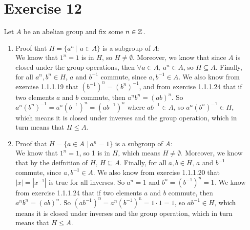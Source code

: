\documentclass[12pt]{article}
\begin{document}
    \section*{Exercise 12}
    Let $A$ be an abelian group and fix some $n \in \mathbb{Z}$. \\
    \begin{enumerate}[label=\textbf{\alph*.}]
        \item 
            Proof that $H = \{a^n \mid a \in A\}$ is a subgroup of $A$: \\
            We know that $1^n = 1$ is in $H$, so $H \neq \emptyset$.
            Moreover, we know that since $A$ is closed under
            the group operations,
            then $\forall a \in A$, $a^n \in A$,
            so $H \subseteq A$.
            Finally, for all $a^n, b^n \in H$, $a$ and $b^{-1}$ commute,
            since $a, b^{-1} \in A$.
            We also know from exercise 1.1.1.19
            that $(b^{-1})^n = (b^n)^{-1}$,
            and from exercise 1.1.1.24 that if two elements $a$ and $b$
            commute, then $a^nb^n = (ab)^n$.
            So $a^n(b^n)^{-1} = a^n(b^{-1})^n = (ab^{-1})^n$
            where $ab^{-1} \in A$,
            so $a^n(b^n)^{-1} \in H$,
            which means it is closed under inverses and the group operation,
            which in turn means that $H \leqslant A$.
        \item
            Proof that $H = \{a \in A \mid a^n = 1\}$ is a subgroup of $A$: \\
            We know that $1^n = 1$, so 1 is in $H$,
            which means $H \neq \emptyset$.
            Moreover, we know that by the deifnition of $H$,
            $H \subseteq A$.
            Finally, for all $a, b \in H$, $a$ and $b^{-1}$ commute,
            since $a, b^{-1} \in A$.
            We also know from exercise 1.1.1.20 that $|x| = |x^{-1}|$
            is true for all inverses.
            So $a^n = 1$ and $b^n = (b^{-1})^n = 1$.
            We know from exercise 1.1.1.24 that if two elements $a$ and $b$
            commute, then $a^nb^n = (ab)^n$.
            So $(ab^{-1})^n = a^n(b^{-1})^n = 1 \cdot 1 = 1$,
            so $ab^{-1} \in H$,
            which means it is closed under inverses and the group operation,
            which in turn means that $H \leqslant A$.
    \end{enumerate}
\end{document}
